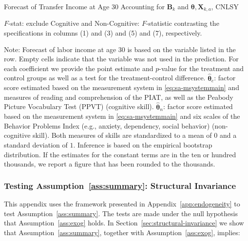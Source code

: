 \begin{table}
\begin{threeparttable}
\caption{Forecast of Transfer Income at Age 30 Accounting for $\bm{B}_k$ and $\bm{\theta}, \bm{X}_{k,a}$, CNLSY} \label{table:trincome}
\centering
\footnotesize

\begin{tablenotes}
\footnotesize
\item $F$-stat: exclude Cognitive and Non-Cognitive: $F$-statistic contrasting the specifications in columns (1) and (3) and (5) and (7), respectively.\\
\item Note: Forecast of labor income at age 30 is based on the variable listed in the row. Empty cells indicate that the variable was not used in the prediction. For each coefficient we provide the point estimate and $p$-value for the treatment and control groups as well as a test for the treatment-control difference. $\hat{\bm{\theta}}_{c}$: factor score estimated based on the measurement system in \eqref{eq:sa-msystemmain} and measures of reading and comprehension of the PIAT, as well as the Peabody Picture Vocabulary Test (PPVT) (cognitive skill). $\hat{\bm{\theta}}_{n}$: factor score estimated based on the measurement system in \eqref{eq:sa-msystemmain} and six scales of the Behavior Problems Index (e.g., anxiety, dependency, social behavior) (non-cognitive skill).  Both measures of skills are standardized to a mean of $0$ and a standard deviation of $1$. Inference is based on the empirical bootstrap distribution. If the estimates for the constant terms are in the ten or hundred thousands, we report a figure that has been rounded to the thousands.
\end{tablenotes}
\end{threeparttable}
\end{table}

\subsubsection{Testing Assumption~\ref{ass:summary}: Structural Invariance} \label{app:invariance}

This appendix uses the framework presented in Appendix~\ref{app:endogeneity} to test Assumption~\ref{ass:summary}. The tests are made under the null hypothesis that Assumption~\ref{ass:exog} holds. In Section~\ref{sec:structural-invariance} we show that Assumption~\ref{ass:summary}, together with Assumption~\ref{ass:exog}, implies:

